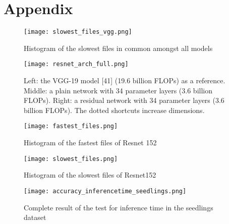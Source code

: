 
\chapter{Appendix}

\begin{figure}[ht]
       \centering 
	    \texttt{[image: slowest\_files\_vgg.png]}
        \caption{Histogram of the slowest files in common amongst all models}
         \label{fig:slowest_files_all}
\end{figure}

\begin{figure}[ht]
       \centering 
	    \texttt{[image: resnet\_arch\_full.png]}
        \caption[Example of the architecture of residual networks]{ Left: the VGG-19 model [41] (19.6 billion FLOPs) as a reference. Middle: a plain network with 34 parameter layers (3.6 billion FLOPs). Right: a residual network with 34 parameter layers (3.6 billion FLOPs). The dotted shortcuts increase dimensions.\cite{DBLP:journals/corr/HeZRS15}}
         \label{fig:resnet_arch_full}
\end{figure}
\begin{figure}[ht]
       \centering 
	    \texttt{[image: fastest\_files.png]}
        \caption{Histogram of the fastest files of Resnet 152}
         \label{fig:fastest_files_his}
\end{figure}

\begin{figure}[ht]
       \centering 
	    \texttt{[image: slowest\_files.png]}
        \caption{Histogram of the slowest files of Resnet152}
         \label{fig:slowest_files_his}
\end{figure}



\begin{figure}[ht]
       \centering 
	    \texttt{[image: accuracy\_inferencetime\_seedlings.png]}
        \caption{Complete result of the test for inference time in the seedlings dataset}
         \label{fig:accuracy_inferencetime_seedlings}
\end{figure}
